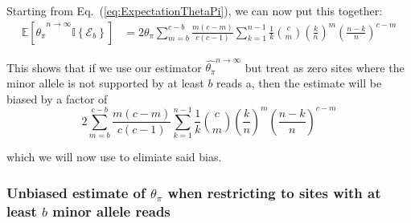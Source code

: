 \documentclass[a4paper,fontsize=9pt,DIV=14]{scrartcl}
\newcounter{todo}
\newcommand\todo[1]{}
\newcommand\eqnref[1]{Eq.~(\ref{#1})}
\newcommand{\samplesize}{n}
\newcommand{\coverage}{c}
\newcommand{\thetapi}{\widehat{\theta_\pi}}
\begin{document}
Starting from \eqnref{eq:ExpectationThetaPi}, we can now put this together:
%
\begin{align}
\nonumber
\mathbb{E}\left[\thetapi^{\samplesize\to\infty} \mathbb{I}\left\{\mathcal{E}_b\right\}\right]  &=2\theta_\pi \sum_{m=b}^{\coverage-b} \frac{m(\coverage-m)}{\coverage(\coverage-1)} \sum_{k=1}^{n-1} \frac{1}{k} \binom{\coverage}{m} \left(\frac{k}{\samplesize}\right)^m \left(\frac{\samplesize-k}{\samplesize}\right)^{\coverage-m}
\end{align}

This shows that if we use our estimator $\thetapi^{\samplesize\to\infty}$ but treat as zero sites where the minor allele is not supported by at least $b$ reads a, then the estimate will be biased by a factor of
\[
2\sum_{m=b}^{\coverage-b} \frac{m(\coverage-m)}{\coverage(\coverage-1)} \sum_{k=1}^{n-1} \frac{1}{k} \binom{\coverage}{m} \left(\frac{k}{\samplesize}\right)^m \left(\frac{\samplesize-k}{\samplesize}\right)^{\coverage-m}
\]

which we will now use to elimiate said bias.




\subsubsection*{Unbiased estimate of $\theta_\pi$ when restricting to sites with at least $b$ minor allele reads}
\label{supp:sec:ThetaPi:sub:PoolSequencing:sub:FinalApprox}
\end{document}
